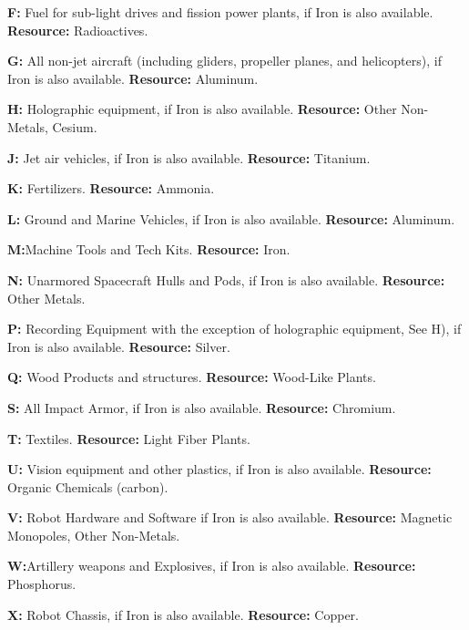 \begin{table}[htbp]
{\begin{minipage}{0.95\textwidth}
\begin{minipage}{0.95\textwidth}
\begin{multicols}{3}
          \textbf{F:} Fuel for sub-light drives and fission 
          power plants, if Iron is also available. 
          \textbf{Resource:} Radioactives. 

          \textbf{G:} All non-jet aircraft (including gliders, 
          propeller planes, and helicopters), if Iron 
          is also available. 
          \textbf{Resource:} Aluminum. 

          \textbf{H:} Holographic equipment, if Iron is also 
          available. 
          \textbf{Resource:} Other Non-Metals, Cesium. 

          \textbf{J:} Jet air vehicles, if Iron is also 
          available. 
          \textbf{Resource:} Titanium. 

          \textbf{K:} Fertilizers. 
          \textbf{Resource:} Ammonia. 

          \textbf{L:} Ground and Marine Vehicles, if Iron is 
          also available. 
          \textbf{Resource:} Aluminum. 

          \textbf{M:}Machine Tools and Tech Kits. 
          \textbf{Resource:} Iron. 

          \textbf{N:} Unarmored Spacecraft Hulls and Pods, if 
          Iron is also available. 
          \textbf{Resource:} Other Metals. 

          \textbf{P:} Recording Equipment with the exception of 
          holographic equipment, See H), if Iron is also 
          available. 
          \textbf{Resource:} Silver. 

          \textbf{Q:} Wood Products and structures. 
          \textbf{Resource:} Wood-Like Plants. 

          \textbf{S:} All Impact Armor, if Iron is also available. 
          \textbf{Resource:} Chromium. 

          \textbf{T:} Textiles. 
          \textbf{Resource:} Light Fiber Plants. 

          \textbf{U:} Vision equipment and other plastics, if Iron is 
          also available. 
          \textbf{Resource:} Organic Chemicals (carbon). 

          \textbf{V:} Robot Hardware and Software if Iron is also 
          available. 
          \textbf{Resource:} Magnetic Monopoles, Other Non-Metals. 

          \textbf{W:}Artillery weapons and Explosives, if Iron is 
          also available. 
          \textbf{Resource:} Phosphorus. 

          \textbf{X:} Robot Chassis, if Iron is also available. 
          \textbf{Resource:} Copper. 


\end{multicols}
\end{minipage}
\end{minipage}}
\end{table}
